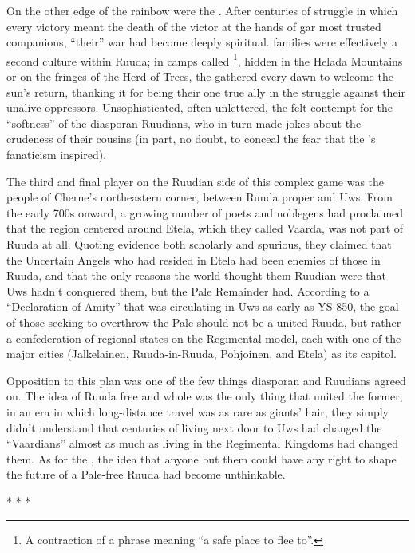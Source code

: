 \documentclass[12pt]{report}
\begin{document}
On the other edge of the rainbow were the {\aemott}.  After centuries
of struggle in which every victory meant the death of the victor at
the hands of gar most trusted companions, ``their'' war had become
deeply spiritual.  {\aemott} families were effectively a second
culture within Ruuda; in camps called \footnote{A
contraction of a phrase meaning ``a safe place to flee to''.}, hidden in
the Helada Mountains or on the fringes of the Herd of Trees, the
{\aemott} gathered every dawn to welcome the sun's return, thanking it
for being their one true ally in the struggle against their unalive
oppressors.  Unsophisticated, often unlettered, the {\aemott} felt
contempt for the ``softness'' of the diasporan Ruudians, who in turn
made jokes about the crudeness of their cousins (in part, no doubt, to
conceal the fear that the {\aemott}'s fanaticism inspired).

The third and final player on the Ruudian side of this complex game
was the people of Cherne's northeastern corner, between Ruuda proper
and Uws.  From the early 700s onward, a growing number of poets and
noblegens had proclaimed that the region centered around Etela, which
they called Vaarda, was not part of Ruuda at all.  Quoting evidence
both scholarly and spurious, they claimed that the Uncertain Angels
who had resided in Etela had been enemies of those in Ruuda, and that
the only reasons the world thought them Ruudian were that Uws hadn't
conquered them, but the Pale Remainder had.  According to a
``Declaration of Amity'' that was circulating in Uws as early as YS 850,
the goal of those seeking to overthrow the Pale should not be a united
Ruuda, but rather a confederation of regional states on the Regimental
model, each with one of the major cities (Jalkelainen, Ruuda-in-Ruuda,
Pohjoinen, and Etela) as its capitol.

Opposition to this plan was one of the few things diasporan and
{\aemott} Ruudians agreed on.  The idea of Ruuda free and whole was
the only thing that united the former; in an era in which
long-distance travel was as rare as giants' hair, they simply didn't
understand that centuries of living next door to Uws had changed the
``Vaardians'' almost as much as living in the Regimental Kingdoms had
changed them.  As for the {\aemott}, the idea that anyone but them
could have any right to shape the future of a Pale-free Ruuda had
become unthinkable.

\begin{center}
* * *
\end{center}
\end{document}
